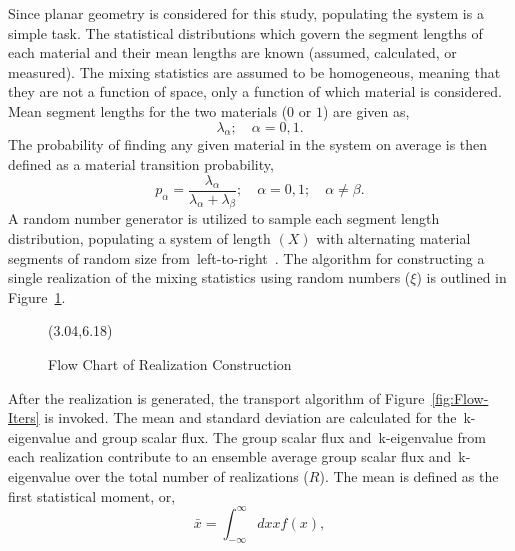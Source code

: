 \noindent
	\indent Since planar geometry is considered for this study, populating the system is a simple
	task.  The statistical distributions which govern the segment lengths of each material and their
	mean lengths are known 	(assumed, calculated, or measured).  The mixing statistics are
	assumed to be homogeneous, meaning that they are not a function of space, only a function
	of which material is considered.  Mean segment lengths for the two materials (${0}$ or ${1}$)
	are given as,
	\begin{equation}
		\lambda_{\alpha}; \quad {\alpha}=0, 1.
	\end{equation}
	The probability of finding any given material in the system on average is then defined as a
	material transition probability,
	\begin{equation}
		p_{\alpha} = \frac{\lambda_{\alpha}}{\lambda_{\alpha} + \lambda_{\beta}}; 
			\quad {\alpha}=0,1; \quad  {\alpha}\not= {\beta}.
		\label{eq:trans-prob}
	\end{equation}
	A random number generator is utilized to sample each segment length distribution,
	populating a system of length ${(X)}$ with alternating material segments of random
	size from~left-to-right~\cite{Ada:89}.
	The algorithm for constructing a single realization of the mixing statistics
	using random numbers (${\xi}$) is outlined in Figure~\ref{fig:Flow-Realz}. 
	\begin{figure}[htbp]
		\begin{center}
			\begin{minipage}[t]{4in}
			\centering
			\begin{picture}(3.04,6.18)
			\end{picture}
			\caption{\label{fig:Flow-Realz} Flow Chart of Realization Construction}
			\end{minipage} %
		\end{center}
	\end{figure}
	After the realization is generated, the transport algorithm of Figure~\ref{fig:Flow-Iters} is invoked.  The
	mean and standard deviation
	are calculated for the~k-eigenvalue and group scalar flux.  The group scalar flux and~k-eigenvalue from each
	realization contribute to an ensemble average group scalar flux and~k-eigenvalue over the total
	number of realizations
	(${R}$).  The mean is defined as the first statistical moment, or,
	\begin{equation}
		\bar{x} = \int_{-\infty}^{\infty} dx x f(x),
		\label{eq:Mean-Def}
	\end{equation}
